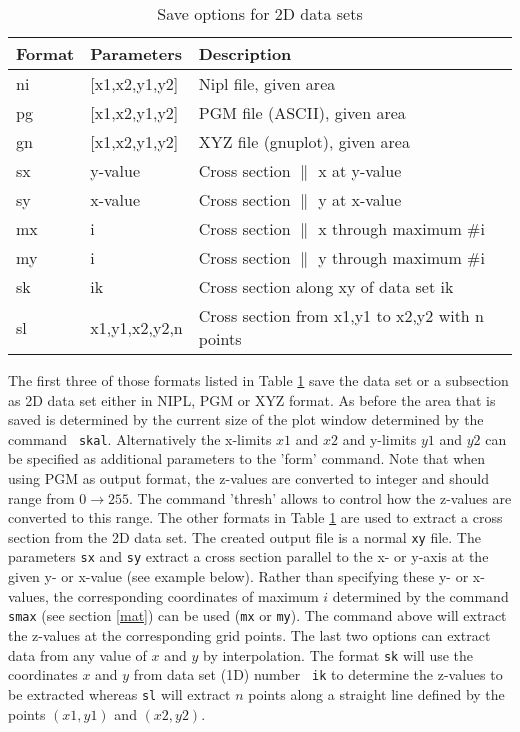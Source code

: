 \begin{table}[!b]
\centering
\begin{tabularx}{\textwidth}{|p{15mm}|p{45mm}|X|}
  \hline
  {\bf Format} & {\bf Parameters} & {\bf Description} \\
  \hline\hline
    ni & [x1,x2,y1,y2] & Nipl file, given area \\
    pg & [x1,x2,y1,y2] & PGM file (ASCII), given area \\
    gn & [x1,x2,y1,y2] & XYZ file (gnuplot), given area \\
  \hline
    sx & y-value       & Cross section $\|$ x at y-value \\
    sy & x-value       & Cross section $\|$ y at x-value \\
    mx & i             & Cross section $\|$ x through maximum \#i \\
    my & i             & Cross section $\|$ y through maximum \#i \\
    sk & ik            & Cross section along xy of data set ik \\
    sl & x1,y1,x2,y2,n & Cross section from x1,y1 to x2,y2 with n points \\
  \hline
\end{tabularx}
\caption{\label{pl2-tab2}Save options for 2D data sets}
\end{table}

The first three of those formats listed in Table \ref{pl2-tab2} save
the data set or a subsection as 2D data set either in NIPL, PGM or
XYZ format. As before the area that is saved is determined by the
current size of the plot window determined by the command {\tt
skal}. Alternatively the x-limits $x1$ and $x2$ and y-limits $y1$
and $y2$ can be specified as additional parameters to the 'form'
command. Note that when using PGM as output format, the z-values are
converted to integer and should range from $0 \rightarrow 255$. The
command 'thresh' allows to control how the z-values are converted to
this range. The other formats in Table \ref{pl2-tab2} are used to
extract a cross section from the 2D data set. The created output
file is a normal {\tt xy} file. The parameters {\tt sx} and {\tt sy}
extract a cross section parallel to the x- or y-axis at the given y-
or x-value (see example below). Rather than specifying these y- or
x-values, the corresponding coordinates of maximum $i$ determined by
the command {\tt smax} (see section \ref{mat}) can be used ({\tt mx}
or {\tt my}). The command above will extract the z-values at the
corresponding grid points. The last two options can extract data
from any value of $x$ and $y$ by interpolation. The format {\tt sk}
will use the coordinates $x$ and $y$ from data set (1D) number {\tt
ik} to determine the z-values to be extracted whereas {\tt sl} will
extract $n$ points along a straight line defined by the points
$(x1,y1)$ and $(x2,y2)$. \par


